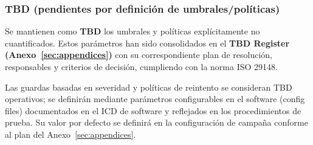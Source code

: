 \subsubsection*{TBD (pendientes por definición de umbrales/políticas)}
Se mantienen como \textbf{TBD} los umbrales y políticas explícitamente no cuantificados. Estos parámetros han sido consolidados en el \textbf{TBD Register (Anexo~\ref{sec:appendices})} con su correspondiente plan de resolución, responsables y criterios de decisión, cumpliendo con la norma ISO 29148. 

Las guardas basadas en severidad y políticas de reintento se consideran TBD operativos; se definirán mediante parámetros configurables en el software (config files) documentados en el ICD de software y reflejados en los procedimientos de prueba. Su valor por defecto se definirá en la configuración de campaña conforme al plan del Anexo~\ref{sec:appendices}.
